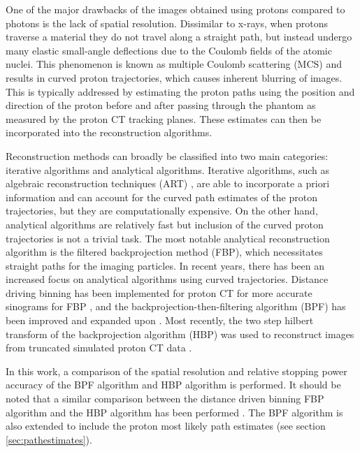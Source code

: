 \documentclass[11pt,a4paper]{article}
\begin{document}
One of the major drawbacks of the images obtained using protons compared to photons is the lack of spatial resolution. Dissimilar to x-rays, when protons traverse a material they do not travel along a straight path, but instead undergo many elastic small-angle deflections due to the Coulomb fields of the atomic nuclei. This phenomenon is known as multiple Coulomb scattering (MCS) and results in curved proton trajectories, which causes inherent blurring of images. This is typically addressed by estimating the proton paths using the position and direction of the proton before and after passing through the phantom as measured by the proton CT tracking planes. These estimates can then be incorporated into the reconstruction algorithms. 

Reconstruction methods can broadly be classified into two main categories: iterative algorithms and analytical algorithms. Iterative algorithms, such as algebraic reconstruction techniques (ART) \parencite{avinash1988principles}, are able to incorporate a priori information and can account for the curved path estimates of the proton trajectories, but they are computationally expensive. On the other hand, analytical algorithms are relatively fast but inclusion of the curved proton trajectories is not a trivial task. The most notable analytical reconstruction algorithm is the filtered backprojection method (FBP), which necessitates straight paths for the imaging particles. In recent years, there has been an increased focus on analytical algorithms using curved trajectories. Distance driving binning has been implemented for proton CT for more accurate sinograms for FBP \parencite{rit2012distance}, and the backprojection-then-filtering algorithm (BPF) has been improved and expanded upon \parencite{poludniowski2014proton}. Most recently, the two step hilbert transform of the backprojection algorithm \parencite{zeng2007image} (HBP) was used to reconstruct images from truncated simulated proton CT data \parencite{rit2015list}.

In this work, a comparison of the spatial resolution and relative stopping power accuracy of the BPF algorithm and HBP algorithm is performed. It should be noted that a similar comparison between the distance driven binning FBP algorithm and the HBP algorithm has been performed \parencite{rit2015list}. The BPF algorithm is also extended to include the proton most likely path estimates (see section \ref{sec:pathestimates}).

\end{document}
